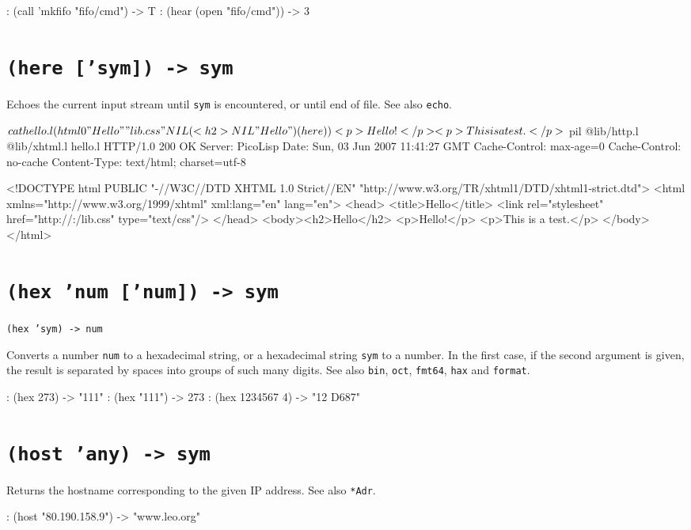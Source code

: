 \begin{wideverbatim}
: (call 'mkfifo "fifo/cmd")
-> T
: (hear (open "fifo/cmd"))
-> 3
\end{wideverbatim}

 
\section*{\texttt{(here ['sym]) -> sym}}
\label{sec:func-ref-H-(here ['sym]) -> sym}


Echoes the current input stream until \texttt{sym} is encountered, or until end
of file. See also \texttt{echo}.


\begin{wideverbatim}
$ cat hello.l
(html 0 "Hello" "lib.css" NIL
   (<h2> NIL "Hello")
   (here) )
<p>Hello!</p>
<p>This is a test.</p>

$ pil @lib/http.l @lib/xhtml.l hello.l
HTTP/1.0 200 OK
Server: PicoLisp
Date: Sun, 03 Jun 2007 11:41:27 GMT
Cache-Control: max-age=0
Cache-Control: no-cache
Content-Type: text/html; charset=utf-8

<!DOCTYPE html PUBLIC "-//W3C//DTD XHTML 1.0 Strict//EN" "http://www.w3.org/TR/xhtml1/DTD/xhtml1-strict.dtd">
<html xmlns="http://www.w3.org/1999/xhtml" xml:lang="en" lang="en">
<head>
<title>Hello</title>
<link rel="stylesheet" href="http://:/lib.css" type="text/css"/>
</head>
<body><h2>Hello</h2>
<p>Hello!</p>
<p>This is a test.</p>
</body>
</html>
\end{wideverbatim}

 
\section*{\texttt{(hex 'num ['num]) -> sym}}
\label{sec:func-ref-H-(hex 'num ['num]) -> sym}


\texttt{(hex 'sym) -> num}

Converts a number \texttt{num} to a hexadecimal string, or a hexadecimal string
\texttt{sym} to a number. In the first case, if the second argument is given,
the result is separated by spaces into groups of such many digits. See
also \texttt{bin}, \texttt{oct}, \texttt{fmt64}, \texttt{hax} and \texttt{format}.


\begin{wideverbatim}
: (hex 273)
-> "111"
: (hex "111")
-> 273
: (hex 1234567 4)
-> "12 D687"
\end{wideverbatim}

 
\section*{\texttt{(host 'any) -> sym}}
\label{sec:func-ref-H-(host 'any) -> sym}


Returns the hostname corresponding to the given IP address. See also
\texttt{*Adr}.


\begin{wideverbatim}
: (host "80.190.158.9")
-> "www.leo.org"
\end{wideverbatim}




% 
